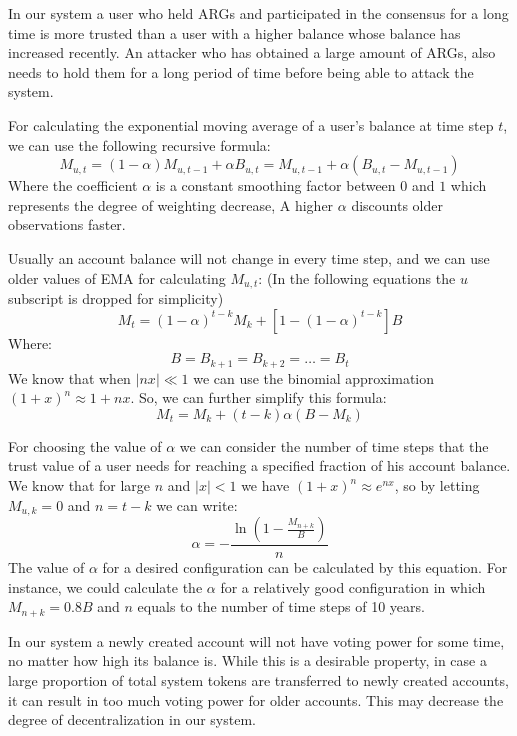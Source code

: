 \documentclass[a4paper]{report}
\begin{document}
    In our system a user who held ARGs and participated in the consensus for a long time is more trusted
    than a user with a higher balance whose balance has increased recently. An attacker who has obtained a large
    amount of ARGs, also needs to hold them for a long period of time before being able to attack the system.

    For calculating the exponential moving average of a user's balance at time step \(t\), we can use the following
    recursive formula:
    \[
        M_{u,t} = (1 - \alpha) M_{u,t-1} + \alpha B_{u,t} = M_{u,t-1} + \alpha (B_{u,t} - M_{u,t-1})
    \]
    Where the coefficient \(\alpha\) is a constant smoothing factor between \(0\) and \(1\) which represents the
    degree of weighting decrease, A higher \(\alpha\) discounts older observations faster.

    Usually an account balance will not change in every time step, and we can use older values of EMA for calculating
    \(M_{u,t}\): (In the following equations the \(u\) subscript is dropped for simplicity)
    \[
        M_{t} = (1 - \alpha)^{t-k}M_{k} + [1 - (1 - \alpha)^{t - k}]B
    \]
    Where:
    \[
        B = B_{k+1} = B_{k+2} = \dots = B_{t}
    \]
    We know that when \(|nx| \ll 1\) we can use the binomial approximation \({(1 + x)^n \approx 1 + nx}\). So, we can
    further simplify this formula:
    \[
        M_{t} = M_{k} + (t - k) \alpha (B - M_{k})
    \]

    For choosing the value of \(\alpha\) we can consider the number of time steps that the trust value of a user needs
    for reaching a specified fraction of his account balance. We know that for large \(n\) and \(|x| < 1\) we have
    \((1 + x)^n \approx e^{nx}\), so by letting \(M_{u,k} = 0\) and \(n = t - k\) we can write:
    \[
        \alpha =- \frac{\ln\left(1 - \frac{M_{n+k}}{B}\right)}{n}
    \]
    The value of \(\alpha\) for a desired configuration can be calculated by this equation. For instance, we could
    calculate the \(\alpha\) for a relatively good configuration in which \(M_{n+k} = 0.8B\) and \(n\) equals to the
    number of time steps of 10 years.

    In our system a newly created account will not have voting power for some time, no matter how high its
    balance is. While this is a desirable property, in case a large proportion of total system tokens are
    transferred to newly created accounts, it can result in too much voting power for older accounts. This may decrease
    the degree of decentralization in our system.
\end{document}
